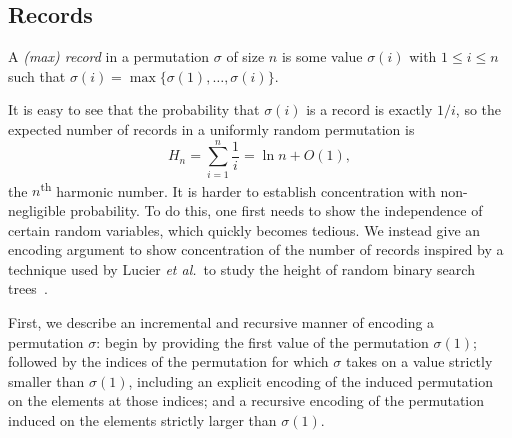 

\subsection{Records}

\begin{defn}
  A \emph{(max) record} in a permutation $\sigma$ of size $n$ is some
  value $\sigma(i)$ with $1 \leq i \leq n$ such that $\sigma(i) =
  \max\{\sigma(1), \ldots, \sigma(i)\}$.
\end{defn}

It is easy to see that the probability that $\sigma(i)$ is a record is
exactly $1/i$, so the expected number of records in a uniformly random
permutation is
\[H_n = \sum_{i = 1}^n \frac{1}{i} = \ln n + O(1),\] the
$n$\textsuperscript{th} harmonic number. It is harder to establish
concentration with non-negligible probability. To do this, one first
needs to show the independence of certain random variables, which
quickly becomes tedious. We instead give an encoding argument to show
concentration of the number of records inspired by a technique used by
Lucier \emph{et al.}~to study the height of random binary search
trees~\cite{lucier.jiang.li:quicksort}.

First, we describe an incremental and recursive manner of encoding a
permutation $\sigma$: begin by providing the first value of the
permutation $\sigma(1)$; followed by the indices of the permutation
for which $\sigma$ takes on a value strictly smaller than $\sigma(1)$,
including an explicit encoding of the induced permutation on the
elements at those indices; and a recursive encoding of the permutation
induced on the elements strictly larger than $\sigma(1)$.

